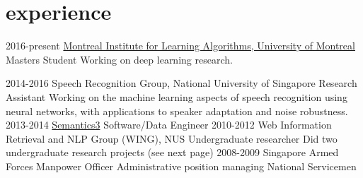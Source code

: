 \documentclass[]{friggeri-cv}
\begin{document}
\section{experience}

\begin{entrylist}
	\entry
	{2016-present}
	{\href{http://mila.umontreal.ca}{Montreal Institute for Learning Algorithms, 
	University of Montreal}}
	{Masters Student}
	{Working on deep learning research.}

	\entry
	{2014-2016}
	{Speech Recognition Group, National University of Singapore}
	{Research Assistant}
	{Working on the machine learning aspects of speech recognition using neural 
	networks, with applications to speaker adaptation and noise robustness.}
	\entry
	{2013-2014}
	{\href{http://semantics3.com}{Semantics3}}
	{Software/Data Engineer}
	{
	\iftoggle{short}{Data scientist / Machine learning engineer related tasks 
	for processing data.}%
	{
		\begin{itemize}[itemsep=0pt,topsep=0pt]
			\item Classification of products into a hierarchical taxonomy using 
				a cascading naive bayes model built using the Lucene index.
			\item Name equivalency model used as part of the disambiguation 
				process to determine if two product names are referring to the 
				same thing.
			\item Experimented with using conditional random fields for 
				attribute extraction from product names.
		\end{itemize}
	}
	}
	\entry
	{2010-2012}
	{Web Information Retrieval and NLP Group (WING), NUS}
	{Undergraduate researcher}
	{Did two undergraduate research projects (see next page)}
	\entry
	{2008-2009}
	{Singapore Armed Forces}
	{Manpower Officer}
	{Administrative position managing National Servicemen}
\iftoggle{short}{}%
{
	\entry
	{01-06 2007}
	{\href{http://www.np.edu.sg/ict/facilities/rhymes/Pages/loc\_rhymes.aspx}{RHyMeS 
	Center, Ngee Ann Polytechnic}}
	{Research/Teaching Assistant}
	{
		\begin{itemize}[itemsep=0pt,topsep=0pt]
			\item Provided technical support for students working on the RHyMeS 
				project.
			\item Facilitated workshops on using the RHyMeS SDK and API.
			\item  Taught students working on their projects how to use the Java 
				Swing UI API
		\end{itemize}
	}
}
\end{entrylist}
\end{document}

